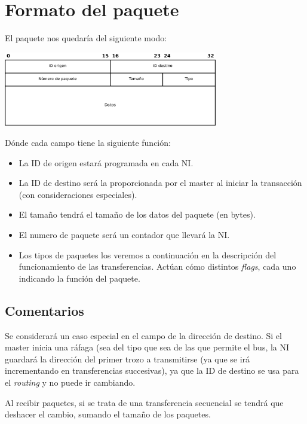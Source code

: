 \documentclass[a4paper, 12pt, babel, spanish]{article}
\begin{document}
\section*{Formato del paquete}

El paquete nos quedaría del siguiente modo:

\begin{center}
\includegraphics[width=0.7\textwidth]{fig/packet}
\end{center}

Dónde cada campo tiene la siguiente función:

\begin{itemize}
\item La ID de origen estará programada en cada NI.
\item La ID de destino será la proporcionada por el master al iniciar la transacción (con consideraciones especiales).
\item El tamaño tendrá el tamaño de los datos del paquete (en bytes).
\item El numero de paquete será un contador que llevará la NI.
\item Los tipos de paquetes los veremos a continuación en la descripción del funcionamiento de las transferencias. Actúan cómo distintos \emph{flags}, cada uno indicando la función del paquete.
\end{itemize}

\subsection*{Comentarios}

Se considerará un caso especial en el campo de la dirección de destino. Si el master inicia una ráfaga (sea del tipo que sea de las que permite el bus, la NI guardará la dirección del primer trozo a transmitirse (ya que se irá incrementando en transferencias succesivas), ya que la ID de destino se usa para el \emph{routing} y no puede ir cambiando. 

Al recibir paquetes, si se trata de una transferencia secuencial se tendrá que deshacer el cambio, sumando el tamaño de los paquetes.
\end{document}

